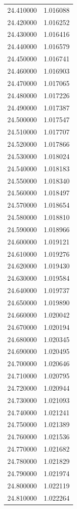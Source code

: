 \begin{tabular}{rr}
24.410000 & 1.016088 \\
24.420000 & 1.016252 \\
24.430000 & 1.016416 \\
24.440000 & 1.016579 \\
24.450000 & 1.016741 \\
24.460000 & 1.016903 \\
24.470000 & 1.017065 \\
24.480000 & 1.017226 \\
24.490000 & 1.017387 \\
24.500000 & 1.017547 \\
24.510000 & 1.017707 \\
24.520000 & 1.017866 \\
24.530000 & 1.018024 \\
24.540000 & 1.018183 \\
24.550000 & 1.018340 \\
24.560000 & 1.018497 \\
24.570000 & 1.018654 \\
24.580000 & 1.018810 \\
24.590000 & 1.018966 \\
24.600000 & 1.019121 \\
24.610000 & 1.019276 \\
24.620000 & 1.019430 \\
24.630000 & 1.019584 \\
24.640000 & 1.019737 \\
24.650000 & 1.019890 \\
24.660000 & 1.020042 \\
24.670000 & 1.020194 \\
24.680000 & 1.020345 \\
24.690000 & 1.020495 \\
24.700000 & 1.020646 \\
24.710000 & 1.020795 \\
24.720000 & 1.020944 \\
24.730000 & 1.021093 \\
24.740000 & 1.021241 \\
24.750000 & 1.021389 \\
24.760000 & 1.021536 \\
24.770000 & 1.021682 \\
24.780000 & 1.021829 \\
24.790000 & 1.021974 \\
24.800000 & 1.022119 \\
24.810000 & 1.022264 \\

\end{tabular}

